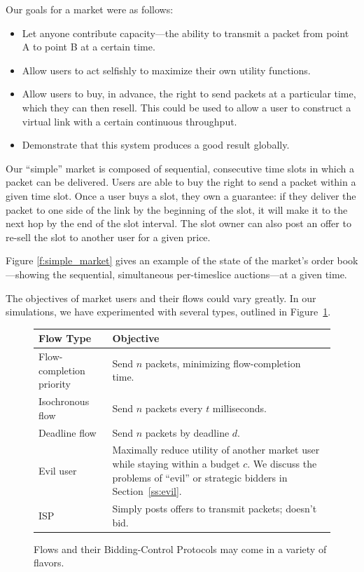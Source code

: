 Our goals for a market were as follows:
\begin{itemize}
\item Let anyone contribute capacity---the ability to transmit a
packet from point A to point B at a certain time.

\item Allow users to act selfishly to maximize their own utility
functions.

\item Allow users to buy, in advance, the right to send packets at a
particular time, which they can then resell. This could be used to
allow a user to construct a virtual link with a certain continuous
throughput.

\item Demonstrate that this system produces a good result globally.
\end{itemize}

Our ``simple'' market is composed of sequential, consecutive time
slots in which a packet can be delivered. Users are able to buy the
right to send a packet within a given time slot.  Once a user buys a slot,
they own a guarantee: if they deliver the packet to one
side of the link by the beginning of the slot, it will make it to the
next hop by the end of the slot interval. The slot owner can also post an offer to re-sell
the slot to another user for a given price.

Figure \ref{f:simple_market} gives an example of the state of the
market's order book---showing the sequential, simultaneous per-timeslice
auctions---at a given time.

The objectives of market users and their flows could vary greatly. In our simulations,
we have experimented with several types, outlined in Figure~\ref{f:user_types}.
\begin{figure}
\begin{tabular}{|p{}|p{}|}
\hline
Flow Type & Objective \\
\hline
\hline
Flow-completion priority & Send $n$ packets, minimizing flow-completion time. \\
\hline
Isochronous flow & Send $n$ packets every $t$ milliseconds. \\
\hline
Deadline flow & Send $n$ packets by deadline $d$. \\
\hline
Evil user & Maximally reduce utility of another market user while
staying within a budget $c$. We discuss the problems of ``evil'' or
strategic bidders in Section~\ref{ss:evil}. \\
\hline
ISP & Simply posts offers to transmit packets; doesn't bid. \\
\hline
\end{tabular}
\caption{Flows and their Bidding-Control Protocols may come in a variety of flavors.}
\label{f:user_types}
\end{figure}

